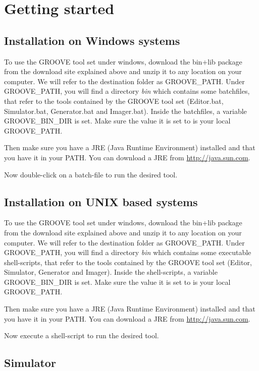 \section{Getting started}

\subsection{Installation on Windows systems}

To use the GROOVE tool set under windows, download the bin+lib package from the download site explained above and unzip it to any location on your computer. We will refer to the destination folder as GROOVE\_PATH. Under GROOVE\_PATH, you will find a directory \emph{bin} which contains some batchfiles, that refer to the tools contained by the GROOVE tool set (Editor.bat, Simulator.bat, Generator.bat and Imager.bat). Inside the batchfiles, a variable GROOVE\_BIN\_DIR is set. Make sure the value it is set to is your local GROOVE\_PATH.

Then make sure you have a JRE (Java Runtime Environment) installed and that you have it in your PATH. You can download a JRE from \url{http://java.sun.com}.

Now double-click on a batch-file to run the desired tool.

\subsection{Installation on UNIX based systems}

To use the GROOVE tool set under windows, download the bin+lib package from the download site explained above and unzip it to any location on your computer. We will refer to the destination folder as GROOVE\_PATH. Under GROOVE\_PATH, you will find a directory \emph{bin} which contains some executable shell-scripts, that refer to the tools contained by the GROOVE tool set (Editor, Simulator, Generator and Imager). Inside the shell-scripts, a variable GROOVE\_BIN\_DIR is set. Make sure the value it is set to is your local GROOVE\_PATH.

Then make sure you have a JRE (Java Runtime Environment) installed and that you have it in your PATH. You can download a JRE from \url{http://java.sun.com}.

Now execute a shell-script to run the desired tool.

\subsection{Simulator}

